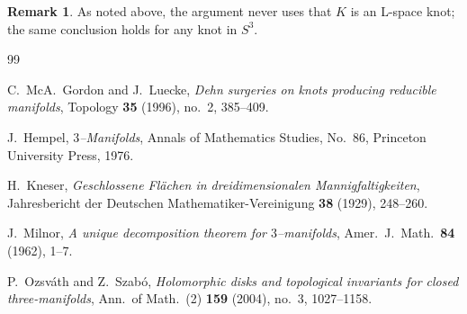 \documentclass[11pt]{article}
\theoremstyle{definition}
\newtheorem{remark}[theorem]{Remark}
\begin{document}
\begin{remark}
As noted above, the argument never uses that $K$ is an L-space knot; the same conclusion holds for any knot in $S^3$.
\end{remark}

\begin{thebibliography}{99}

C.~McA.~Gordon and J.~Luecke,
\newblock \emph{Dehn surgeries on knots producing reducible manifolds},
\newblock Topology \textbf{35} (1996), no.~2, 385--409.

J.~Hempel,
\newblock \emph{$3$--Manifolds},
\newblock Annals of Mathematics Studies, No.~86, Princeton University Press, 1976.

H.~Kneser,
\newblock \emph{Geschlossene Fl{\"a}chen in dreidimensionalen Mannigfaltigkeiten},
\newblock Jahresbericht der Deutschen Mathematiker-Vereinigung \textbf{38} (1929), 248--260.

J.~Milnor,
\newblock \emph{A unique decomposition theorem for $3$--manifolds},
\newblock Amer.\ J.\ Math.\ \textbf{84} (1962), 1--7.

P.~Ozsv\'ath and Z.~Szab\'o,
\newblock \emph{Holomorphic disks and topological invariants for closed three-manifolds},
\newblock Ann.\ of Math.\ (2) \textbf{159} (2004), no.~3, 1027--1158.

\end{thebibliography}
\end{document}
